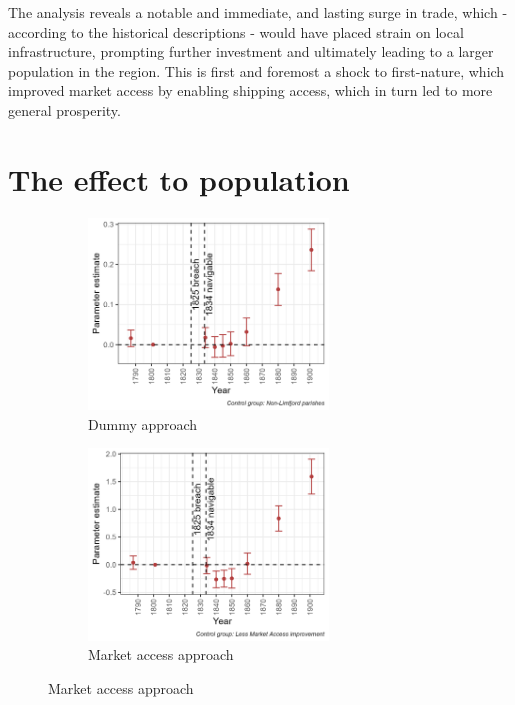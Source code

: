 \documentclass[11pt]{article}
\begin{document}
The analysis reveals a notable and immediate, and lasting surge in trade, which - according to the historical descriptions - would have placed strain on local infrastructure, prompting further investment and ultimately leading to a larger population in the region. This is first and foremost a shock to first-nature, which improved market access by enabling shipping access, which in turn led to more general prosperity. 

\FloatBarrier
\section{The effect to population}

\begin{figure}[h]
    \centering
    \caption{Effect of the Agger channel on population size}
    \begin{subfigure}[b]{0.8\textwidth}
        \centering
        \caption{Dummy approach}
        \includegraphics[width=0.7\textwidth]{Plots/Regression_plots/pop_dummy.png}
    \end{subfigure}
    \vspace{1cm}
    \begin{subfigure}[b]{0.8\textwidth}
        \centering
        \caption{Market access approach}
        \includegraphics[width=0.7\textwidth]{Plots/Regression_plots/pop_MA.png}

\end{subfigure}
\end{figure}
\end{document}
